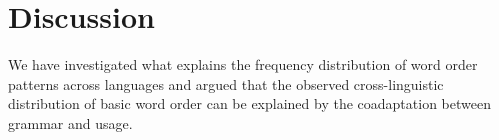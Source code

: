 \documentclass[11pt,a4paper]{article}
\begin{document}




















\section*{Discussion}

We have investigated what explains the frequency distribution of word order patterns across languages and argued that the observed cross-linguistic distribution of basic word order can be explained by the coadaptation between grammar and usage.
\end{document}
